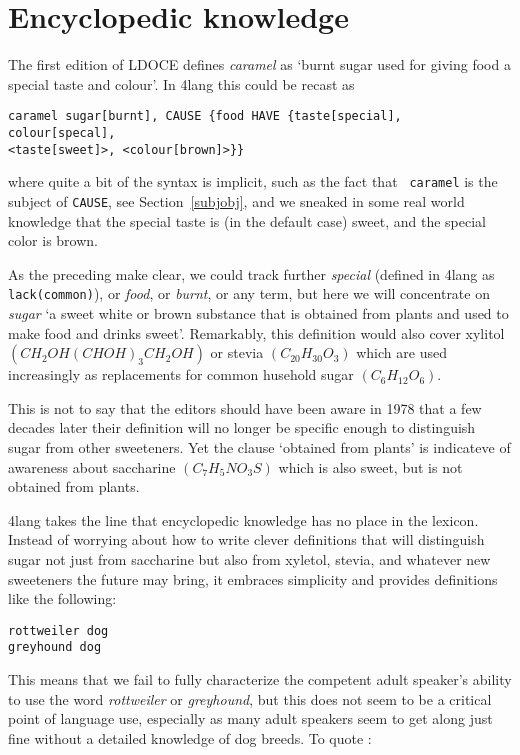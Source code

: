 \documentclass[11pt,bookmarks,bookmarksnumbered,naturalnames,plainpages=false,pdftex,colorlinks=true,urlcolor=blue,bookmarksdepth=subsection,plainpages=false]{paper}
\begin{document}
\section{Encyclopedic knowledge}

The first edition of LDOCE \citep{Procter:1978} defines {\it caramel} as
`burnt sugar used for giving food a special taste and colour'. In 4lang this
could be recast as 

\begin{verbatim}
caramel sugar[burnt], CAUSE {food HAVE {taste[special], colour[specal], 
<taste[sweet]>, <colour[brown]>}}
\end{verbatim}

\noindent
where quite a bit of the syntax is implicit, such as the fact that {\tt
  caramel} is the subject of {\tt CAUSE}, see Section~\ref{subjobj}, and we
sneaked in some real world knowledge that the special taste is (in the default
case) sweet, and the special color is brown.

As the preceding make clear, we could track further {\it special} (defined in
4lang as {\tt lack(common)}), or {\it food}, or {\it burnt}, or any term, but
here we will concentrate on {\it sugar} `a sweet white or brown substance that
is obtained from plants and used to make food and drinks sweet'. Remarkably,
this definition would also cover xylitol $(CH_2OH(CHOH)_3CH_2OH)$ or stevia
$(C_{20}H_{30}O_3)$ which are used increasingly as replacements for common
husehold sugar $(C_6H_{12}O_6)$.

This is not to say that the editors should have been aware in 1978 that a few
decades later their definition will no longer be specific enough to
distinguish sugar from other sweeteners. Yet the clause `obtained from
plants' is indicateve of awareness about saccharine $(C_7H_5NO_3S)$ which is
also sweet, but is not obtained from plants.  

4lang takes the line that encyclopedic knowledge has no place in the
lexicon. Instead of worrying about how to write clever definitions that will
distinguish sugar not just from saccharine but also from xyletol, stevia, and
whatever new sweeteners the future may bring, it embraces simplicity and
provides definitions like the following:

\begin{verbatim} 
rottweiler dog
greyhound dog
\end{verbatim}

\noindent
This means that we fail to fully characterize the competent adult speaker's
ability to use the word {\it rottweiler} or {\it greyhound}, but this does not
seem to be a critical point of language use, especially as many adult speakers
seem to get along just fine without a detailed knowledge of dog breeds. To
quote \cite{Kornai:2010}:
\end{document}
